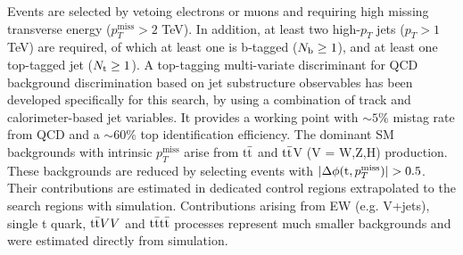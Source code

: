 \documentclass[11pt,twoside,a4paper]{cernrep}
\begin{document}
Events are selected by vetoing electrons or muons and requiring high missing transverse energy ($p_T^{\mathrm{miss}}>2$ TeV). In addition, at least two high-$p_T$ jets ($p_T > 1$ TeV) are required, of which at least one is b-tagged ($N_{\rm b} \geq 1$), and at least one top-tagged jet ($N_{\rm t} \geq 1$). A top-tagging multi-variate discriminant for QCD background discrimination based on jet substructure observables has been developed specifically for this search, by using a combination of track and calorimeter-based jet variables. It provides a working point with $\sim5\%$ mistag rate from QCD and a $\sim60\%$ top identification efficiency. The dominant SM backgrounds with intrinsic $p_T^{\mathrm{miss}}$ arise from $\rm t \bar{t}$ and $\rm t \bar{t}$V (V {=} W,Z,H) production. These backgrounds are reduced by selecting events with $|\Delta \phi({\rm t},p_T^{\mathrm{miss}})| > 0.5$.  Their contributions are estimated in dedicated control regions extrapolated to the search regions with simulation. Contributions arising from EW (e.g. V+jets), single t quark, ${\rm t \bar{t}} VV$ and $\rm t \bar{t} t \bar{t}$ processes represent much smaller backgrounds and were estimated directly from simulation.
\end{document}
